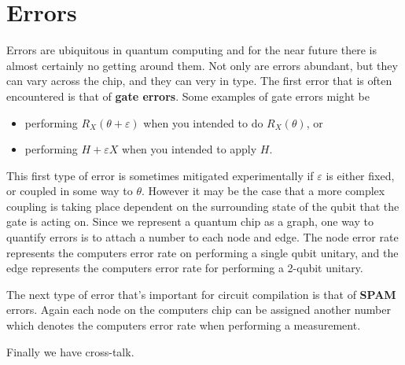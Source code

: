 \section{Errors}

Errors are ubiquitous in quantum computing and for the near future there is almost certainly no getting around them.
Not only are errors abundant, but they can vary across the chip, and they can very in type.
The first error that is often encountered is that of \textbf{gate errors}.
Some examples of gate errors might be
\begin{itemize}
    \item performing $R_X(\theta + \varepsilon)$ when you intended to do $R_X(\theta)$, or
    \item performing $H + \varepsilon X$ when you intended to apply $H$.
\end{itemize}
This first type of error is sometimes mitigated experimentally if $\varepsilon$ is either fixed, or coupled in some way to $\theta$.
However it may be the case that a more complex coupling is taking place dependent on the surrounding state of the qubit that the gate is acting on.
Since we represent a quantum chip as a graph, one way to quantify errors is to attach a number to each node and edge.
The node error rate represents the computers error rate on performing a single qubit unitary, and the edge represents the computers error rate for performing a 2-qubit unitary.

The next type of error that's important for circuit compilation is that of \textbf{\ac{SPAM}} errors. %
Again each node on the computers chip can be assigned another number which denotes the computers error rate when performing a measurement.

Finally we have cross-talk.
